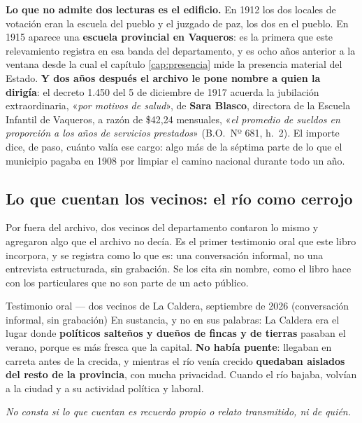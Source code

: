 \textbf{Lo que no admite dos lecturas es el edificio.} En 1912 los dos locales de votación eran la
escuela del pueblo y el juzgado de paz, los dos en el pueblo. En 1915 aparece una \textbf{escuela
provincial en Vaqueros}: es la primera que este relevamiento registra en esa banda del departamento, y
es ocho años anterior a la ventana desde la cual el capítulo \ref{cap:presencia} mide la presencia
material del Estado. \textbf{Y dos años después el archivo le pone nombre a quien la dirigía}: el decreto 1.450 del 5 de diciembre de 1917 acuerda la jubilación extraordinaria, «\textit{por motivos de salud}», de \textbf{Sara Blasco}, directora de la Escuela Infantil de Vaqueros, a razón de \$42,24 mensuales, «\textit{el promedio de sueldos en proporción a los años de servicios prestados}» (B.O.\ Nº 681, h.\ 2). El importe dice, de paso, cuánto valía ese cargo: algo más de la séptima parte de lo que el municipio pagaba en 1908 por limpiar el camino nacional durante todo un año.

\subsection*{Lo que cuentan los vecinos: el río como cerrojo}

Por fuera del archivo, dos vecinos del departamento contaron lo mismo y agregaron algo que
el archivo no decía. Es el primer testimonio oral que este libro incorpora, y se registra como
lo que es: una conversación informal, no una entrevista estructurada, sin grabación. Se los
cita sin nombre, como el libro hace con los particulares que no son parte de un acto público.

\begin{ficha}{Testimonio oral --- dos vecinos de La Caldera, septiembre de 2026 (conversación informal, sin grabación)}
En sustancia, y no en sus palabras: La Caldera era el lugar donde \textbf{políticos salteños y
dueños de fincas y de tierras} pasaban el verano, porque es más fresca que la capital.
\textbf{No había puente}: llegaban en carreta antes de la crecida, y mientras el río venía
crecido \textbf{quedaban aislados del resto de la provincia}, con mucha privacidad. Cuando el
río bajaba, volvían a la ciudad y a su actividad política y laboral.

\textit{No consta si lo que cuentan es recuerdo propio o relato transmitido, ni de quién.}
\end{ficha}


